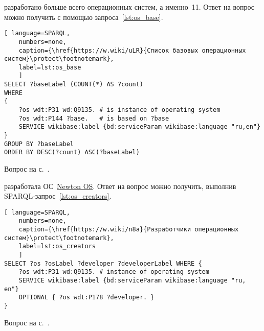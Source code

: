 \newpage
\begin{task}
\label{answer:os_base}
    разработано больше всего операционных систем, а именно~11. 
    Ответ на вопрос можно получить с помощью запроса~\ref{lst:os_base}.

\begin{lstlisting}[ language=SPARQL, 
    numbers=none,
    caption={\href{https://w.wiki/uLR}{Список базовых операционных систем}\protect\footnotemark},
	label=lst:os_base
	]
SELECT ?baseLabel (COUNT(*) AS ?count)
WHERE
{
	?os wdt:P31 wd:Q9135. # is instance of operating system
	?os wdt:P144 ?base.   # is based on ?base
	SERVICE wikibase:label {bd:serviceParam wikibase:language "ru,en"}
}
GROUP BY ?baseLabel
ORDER BY DESC(?count) ASC(?baseLabel)\end{lstlisting}

\small{Вопрос на с.~\pageref{lst:base_of_operating_systems}.}
\end{task}



\begin{task}
\label{answer:what_system_created}
 разработала ОС~\href{https://w.wiki/n8P}{Newton OS}. Ответ на вопрос можно получить, выполнив SPARQL-запрос~\ref{lst:os_creators}.

\begin{lstlisting}[ language=SPARQL, 
    numbers=none,
    caption={\href{https://w.wiki/n8a}{Разработчики операционных систем}\protect\footnotemark},
	label=lst:os_creators
	]
SELECT ?os ?osLabel ?developer ?developerLabel WHERE {
	?os wdt:P31 wd:Q9135. # instance of operating system
	SERVICE wikibase:label {bd:serviceParam wikibase:language "ru, en"}
	OPTIONAL { ?os wdt:P178 ?developer. }
}\end{lstlisting}

\small{Вопрос на с.~\pageref{lst:inception_time_of_operating_systems}.}
\end{task}




